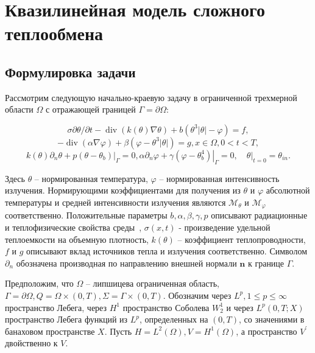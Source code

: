 \section{Квазилинейная модель сложного теплообмена}
\label{sec:ch1/sec5}

\subsection{Формулировка задачи}
\label{subsec:ch1/sec5/subsec1}

Рассмотрим следующую начально-краевую задачу в ограниченной трехмерной
области $\Omega$ с отражающей границей $\Gamma=\partial \Omega$:

\begin{equation}
    \label{eq:1_6:1}
    \sigma \partial \theta / \partial t
    -\operatorname{div}(k(\theta) \nabla \theta)
    +b\left(\theta^{3}|\theta|-\varphi\right)=f,
\end{equation}
\begin{equation}
    \label{eq:1_6:2}
    -\operatorname{div}(\alpha \nabla \varphi)
    +\beta\left(\varphi-\theta^{3}|\theta|\right)=g, x \in \Omega, 0<t<T,
\end{equation}
\begin{equation}
    \label{eq:1_6:3}
    k(\theta) \partial_{n} \theta+\left.p\left(\theta-\theta_{b}\right)\right|_{\Gamma}=0,
    \alpha \partial_{n} \varphi
    +\left.\gamma\left(\varphi-\theta_{b}^{4}\right)\right|_{\Gamma}=0,
    \left.\quad \theta\right|_{t=0}=\theta_{in}.
\end{equation}


Здесь $\theta$ -- нормированная температура, $\varphi$ -- нормированная интенсивность излучения.
Нормирующими коэффициентами для получения из $\theta$ и $\varphi$ абсолютной температуры
и средней интенсивности излучения являются $\mathcal{M}_{\theta}$ и $\mathcal{M}_{\varphi}$ соответственно.
Положительные параметры $b, \alpha, \beta, \gamma, p$ описывают радиационные
и теплофизические свойства среды~\cite{ESAIM}, $\sigma(x, t)$ - произведение удельной
теплоемкости на объемную плотность, $k(\theta)$ -- коэффициент теплопроводности,
$f$ и $g$ описывают вклад источников тепла и излучения соответственно.
Символом $\partial_{n}$ обозначена производная по направлению
внешней нормали $\mathbf{n}$ к границе $\Gamma$.

Предположим, что $\Omega$ -- липшицева ограниченная область,
$\Gamma=\partial \Omega, Q=\Omega \times(0, T), \Sigma=\Gamma \times(0, T)$.
Обозначим через $L^{p}, 1 \leq p \leq \infty$ пространство Лебега,
через $H^{1}$ пространство Соболева $W_{2}^{1}$ и через $L^{p}(0, T ; X)$
пространство Лебега функций из $L^{p}$, определенных на $(0, T)$,
со значениями в банаховом пространстве $X$.
Пусть $H=L^{2}(\Omega), V=H^{1}(\Omega)$,
а пространство $V^{\prime}$ двойственно к $V$.


